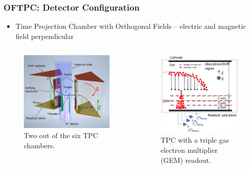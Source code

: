 \documentclass{beamer}
\begin{document}
	\begin{frame}
		\frametitle{OFTPC: Detector Configuration}
		\begin{itemize}
			\item Time Projection Chamber with Orthogonal Fields -- electric and magnetic field perpendicular
		\end{itemize}
		\begin{columns}
			\begin{figure}
				\centering
				\begin{minipage}[t][4.1cm]{\textwidth}
					\centering
					\includegraphics[width=0.83\linewidth]{../images/diagram.png}\newline
				\end{minipage}
				\caption{Two out of the six TPC chambers.~\cite{poster}}
				\label{fig:dia}
			\end{figure}
			\begin{figure}
				\centering
				\begin{minipage}[t][4.1cm]{\textwidth}
					\centering
					\includegraphics[width=0.73\linewidth]{../images/diagram2.png}\newline
				\end{minipage}
				\caption{TPC with a triple gas electron multiplier (GEM) readout.~\cite{poster}}
				\label{fig:dia2}
			\end{figure}
		\end{columns}
	\end{frame}
\end{document}

